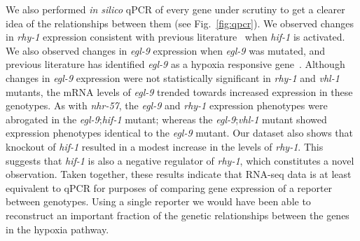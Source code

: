 \documentclass[9pt,twocolumn,twoside]{pnas-new}
\newcommand{\egl}{\emph{egl-9}}
\newcommand{\rhy}{\emph{rhy-1}}
\newcommand{\vhl}{\emph{vhl-1}}
\newcommand{\hif}{\emph{hif-1}}
\newcommand{\nhr}{\emph{nhr-57}}
\newcommand{\hifp}{HIF-1}
\begin{document}
We also performed \emph{in silico} qPCR of every gene under scrutiny to get a
clearer idea of the relationships between them (see Fig.~\ref{fig:qpcr}). We
observed changes in \rhy{} expression consistent with previous
literature~\cite{} when \hif{} is activated. We also observed changes in \egl{}
expression when \egl{} was mutated, and previous literature has identified
\egl{} as a hypoxia responsive gene~\cite{}. Although changes in \egl{} expression
were not statistically significant in \rhy{} and \vhl{} mutants, the mRNA levels
of \egl{} trended towards increased expression in these genotypes.
As with \nhr{}, the \egl{} and \rhy{} expression phenotypes were abrogated in
the \egl{};\hif{} mutant; whereas the \egl{};\vhl{} mutant showed expression
phenotypes identical to the \egl{} mutant.
Our dataset also shows that knockout of \hif{} resulted in a modest increase in
the levels of \rhy{}. This suggests that \hif{} is also a negative regulator of
\rhy{}, which constitutes a novel observation.
Taken together, these results indicate that RNA-seq data is at least equivalent
to qPCR for purposes of comparing gene expression of a reporter between genotypes.
Using a single reporter we would have been able to reconstruct an important fraction
of the genetic relationships between the genes in the hypoxia pathway.

\end{document}
